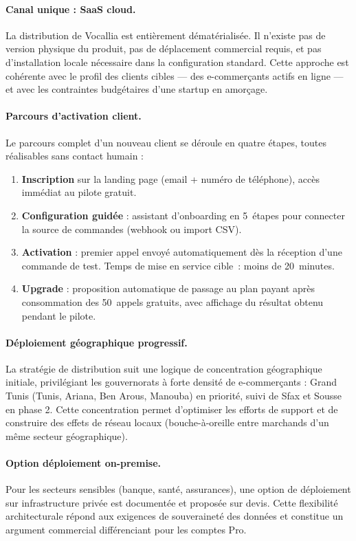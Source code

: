 \paragraph{Canal unique : SaaS cloud.}
La distribution de Vocallia est entièrement dématérialisée. Il n'existe pas de
version physique du produit, pas de déplacement commercial requis, et pas
d'installation locale nécessaire dans la configuration standard. Cette approche
est cohérente avec le profil des clients cibles --- des e-commerçants actifs en
ligne --- et avec les contraintes budgétaires d'une startup en amorçage.

\paragraph{Parcours d'activation client.}
Le parcours complet d'un nouveau client se déroule en quatre étapes, toutes
réalisables sans contact humain :
\begin{enumerate}
    \item \textbf{Inscription} sur la landing page (email + numéro de téléphone),
    accès immédiat au pilote gratuit.
    \item \textbf{Configuration guidée} : assistant d'onboarding en 5~étapes
    pour connecter la source de commandes (webhook ou import CSV).
    \item \textbf{Activation} : premier appel envoyé automatiquement dès la
    réception d'une commande de test. Temps de mise en service cible~: moins de
    20~minutes.
    \item \textbf{Upgrade} : proposition automatique de passage au plan payant
    après consommation des 50~appels gratuits, avec affichage du résultat
    obtenu pendant le pilote.
\end{enumerate}

\paragraph{Déploiement géographique progressif.}
La stratégie de distribution suit une logique de concentration géographique
initiale, privilégiant les gouvernorats à forte densité de e-commerçants :
Grand Tunis (Tunis, Ariana, Ben Arous, Manouba) en priorité, suivi de Sfax et
Sousse en phase 2. Cette concentration permet d'optimiser les efforts de
support et de construire des effets de réseau locaux (bouche-à-oreille entre
marchands d'un même secteur géographique).

\paragraph{Option déploiement on-premise.}
Pour les secteurs sensibles (banque, santé, assurances), une option de
déploiement sur infrastructure privée est documentée et proposée sur devis.
Cette flexibilité architecturale répond aux exigences de souveraineté des
données et constitue un argument commercial différenciant pour les comptes Pro.

